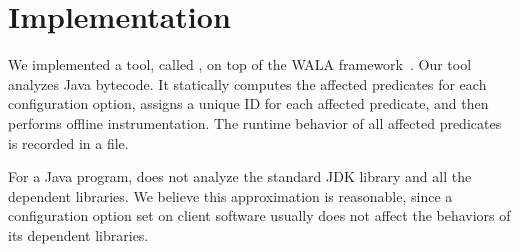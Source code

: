 \section{Implementation}
\label{sec:implementation}

We implemented a tool, called \ourtool, on top of the WALA
framework~\cite{wala}. Our tool analyzes Java bytecode.
It statically computes the affected predicates
for each configuration option, assigns a unique
ID for each affected predicate, and then performs offline instrumentation.
The runtime behavior of all affected predicates is recorded
in a file. 



For a Java program, \ourtool does not analyze the standard JDK
library and all the dependent libraries. We believe this approximation
is reasonable, since a configuration option set on client software
usually does not affect the behaviors of its dependent libraries.


